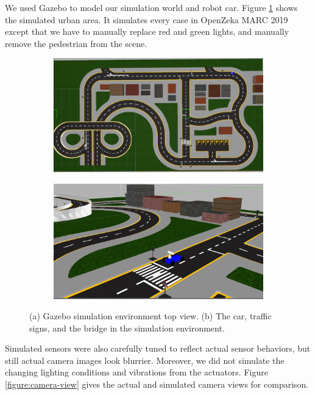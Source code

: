 We used Gazebo to model our simulation world and robot car. Figure
\ref{figure:simulation-environment} shows the simulated urban area. It
simulates every case in OpenZeka MARC 2019 except that we have to manually
replace red and green lights, and manually remove the pedestrian from the
scene.

\begin{figure}[h]
  \centering
  \begin{subfigure}[b]{0.4\linewidth}
      \includegraphics[width=\linewidth]{figures/simulation-environment1.png}
    \caption{}
  \end{subfigure}
  \begin{subfigure}[b]{0.4\linewidth}
      \includegraphics[width=\linewidth]{figures/simulation-environment2.png}
    \caption{}
  \end{subfigure}
  \caption{(a) Gazebo simulation environment top view. (b) The car, traffic
  signs, and the bridge in the simulation environment.}
  \label{figure:simulation-environment}
\end{figure}

Simulated sensors were also carefully tuned to reflect actual sensor behaviors,
but still actual camera images look blurrier. Moreover, we did not simulate the
changing lighting conditions and vibrations from the actuators. Figure
\ref{figure:camera-view} gives the actual and simulated camera views for
comparison.

